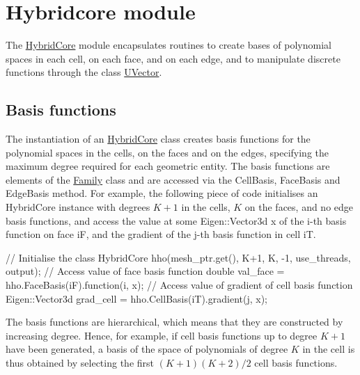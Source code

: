 \label{_hybridcore}%
 \hypertarget{index_hybridcore}{}\section{Hybridcore module}\label{index_hybridcore}
The \hyperlink{classHArDCore3D_1_1HybridCore}{Hybrid\+Core} module encapsulates routines to create bases of polynomial spaces in each cell, on each face, and on each edge, and to manipulate discrete functions through the class \hyperlink{classHArDCore3D_1_1UVector}{U\+Vector}.\hypertarget{index_basisfunc}{}\subsection{Basis functions}\label{index_basisfunc}
The instantiation of an \hyperlink{classHArDCore3D_1_1HybridCore}{Hybrid\+Core} class creates basis functions for the polynomial spaces in the cells, on the faces and on the edges, specifying the maximum degree required for each geometric entity. The basis functions are elements of the \hyperlink{classHArDCore3D_1_1Family}{Family} class and are accessed via the Cell\+Basis, Face\+Basis and Edge\+Basis method. For example, the following piece of code initialises an Hybrid\+Core instance with degrees $K+1$ in the cells, $K$ on the faces, and no edge basis functions, and access the value at some Eigen\+::\+Vector3d x of the i-\/th basis function on face iF, and the gradient of the j-\/th basis function in cell iT.


\begin{DoxyCode}
\textcolor{comment}{// Initialise the class}
HybridCore hho(mesh\_ptr.get(), K+1, K, -1, use\_threads, output);
\textcolor{comment}{// Access value of face basis function}
\textcolor{keywordtype}{double} val\_face = hho.FaceBasis(iF).function(i, x);
\textcolor{comment}{// Access value of gradient of cell basis function}
Eigen::Vector3d grad\_cell = hho.CellBasis(iT).gradient(j, x);
\end{DoxyCode}


The basis functions are hierarchical, which means that they are constructed by increasing degree. Hence, for example, if cell basis functions up to degree $K+1$ have been generated, a basis of the space of polynomials of degree $K$ in the cell is thus obtained by selecting the first $(K+1)(K+2)/2$ cell basis functions.

